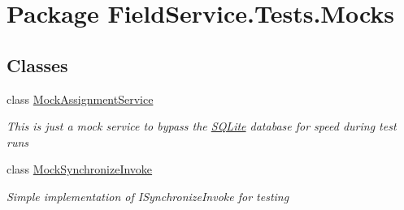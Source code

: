 \hypertarget{namespace_field_service_1_1_tests_1_1_mocks}{\section{Package Field\+Service.\+Tests.\+Mocks}
\label{namespace_field_service_1_1_tests_1_1_mocks}
}
\subsection*{Classes}
\begin{DoxyCompactItemize}
\item 
class \hyperlink{class_field_service_1_1_tests_1_1_mocks_1_1_mock_assignment_service}{Mock\+Assignment\+Service}
\begin{DoxyCompactList}\small\item\em This is just a mock service to bypass the \hyperlink{namespace_s_q_lite}{S\+Q\+Lite} database for speed during test runs \end{DoxyCompactList}\item 
class \hyperlink{class_field_service_1_1_tests_1_1_mocks_1_1_mock_synchronize_invoke}{Mock\+Synchronize\+Invoke}
\begin{DoxyCompactList}\small\item\em Simple implementation of I\+Synchronize\+Invoke for testing \end{DoxyCompactList}\end{DoxyCompactItemize}
